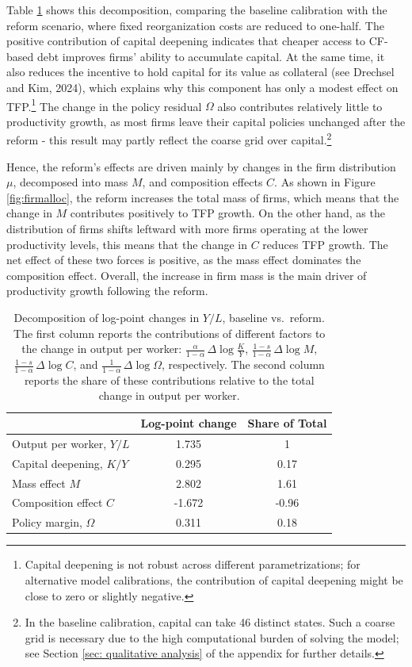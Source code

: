 \documentclass[12pt]{article}
\begin{document}
Table \ref{tab:decomposition} shows this decomposition, comparing the baseline calibration with the reform scenario, where fixed reorganization costs are reduced to one-half. The positive contribution of capital deepening indicates that cheaper access to CF-based debt improves firms' ability to accumulate capital. At the same time, it also reduces the incentive to hold capital for its value as collateral (see Drechsel and Kim, 2024), which explains why this component has only a modest effect on TFP.\footnote{Capital deepening is not robust across different parametrizations; for alternative model calibrations, the contribution of capital deepening might be close to zero or slightly negative.} The change in the policy residual $\Omega$ also contributes relatively little to productivity growth, as most firms leave their capital policies unchanged after the reform - this result may partly reflect the coarse grid over capital.\footnote{In the baseline calibration, capital can take 46 distinct states. Such a coarse grid is necessary due to the high computational burden of solving the model; see Section \ref{sec: qualitative analysis} of the appendix for further details.} 

Hence, the reform's effects are driven mainly by changes in the firm distribution $\mu$, decomposed into mass $M$, and composition effects $C$. As shown in Figure \ref{fig:firmalloc}, the reform increases the total mass of firms, which means that the change in $M$ contributes positively to TFP growth. On the other hand, as the distribution of firms shifts leftward with more firms operating at the lower productivity levels, this means that the change in $C$ reduces TFP growth. The net effect of these two forces is positive, as the mass effect dominates the composition effect. Overall, the increase in firm mass is the main driver of productivity growth following the reform.

\begin{table}[H]
\centering
\begin{tabular}{lcc}
\toprule
 & Log-point change & Share of Total \\
\midrule
Output per worker, $Y/L$    & 1.735 &  1 \\
\midrule
Capital deepening, $K/Y$    & 0.295 & 0.17 \\
Mass effect $M$             & 2.802 & 1.61 \\
Composition effect $C$      & -1.672 & -0.96 \\
Policy margin, $\Omega$     & 0.311 & 0.18 \\
\bottomrule
\end{tabular}
\caption{\small Decomposition of log-point changes in $Y/L$, baseline vs.~reform. 
The first column reports the contributions of different factors to the change in output per worker: 
$\tfrac{\alpha}{1-\alpha}\,\Delta\log \tfrac{K}{Y}$, 
$\tfrac{1-s}{1-\alpha}\,\Delta\log M$, 
$\tfrac{1-s}{1-\alpha}\,\Delta\log C$, and 
$\tfrac{1}{1-\alpha}\,\Delta\log \Omega$, respectively. The second column reports the share of these contributions relative to the total change in output per worker.}
\label{tab:decomposition}
\end{table}
\end{document}
